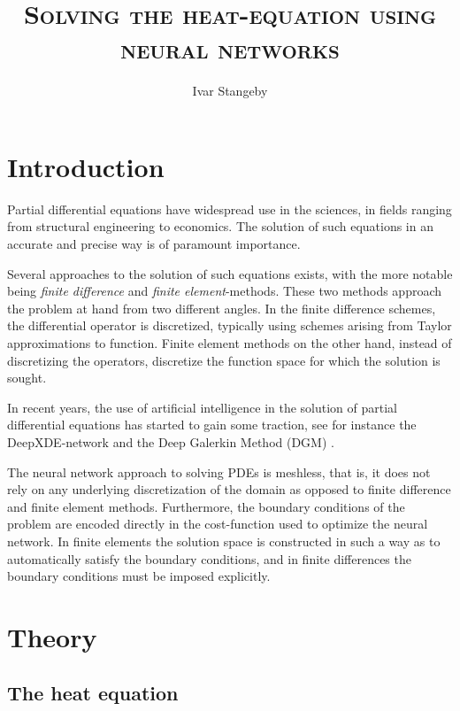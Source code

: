 \documentclass[article, a4paper, oneside]{memoir}
\title{\textsc{Solving the heat-equation using neural networks}}
\author{Ivar Stangeby}
\begin{document}
	\maketitle	

	\chapter{Introduction}

	Partial differential equations have widespread use in the sciences, in
	fields ranging from structural engineering to economics. The solution
	of such equations in an accurate and precise way is of paramount
	importance.

	Several approaches to the solution of such equations exists, with the
	more notable being \emph{finite difference} and \emph{finite
	element}-methods. These two methods approach the problem at hand from
	two different angles. In the finite difference schemes, the
	differential operator is discretized, typically using schemes arising
	from Taylor approximations to function. Finite element methods on the
	other hand, instead of discretizing the operators, discretize the
	function space for which the solution is sought.

	In recent years, the use of artificial intelligence in the solution of
	partial differential equations has started to gain some traction, see
	for instance the DeepXDE-network \cite{luDeepXDEDeepLearning2019} and
	the Deep Galerkin Method (DGM)
	\cite{al-aradiSolvingNonlinearHighDimensional}.
	
	The neural network approach to solving PDEs is meshless, that is, it
	does not rely on any underlying discretization of the domain as opposed
	to finite difference and finite element methods. Furthermore, the
	boundary conditions of the problem are encoded directly in the
	cost-function used to optimize the neural network. In finite elements
	the solution space is constructed in such a way as to automatically
	satisfy the boundary conditions, and in finite differences the boundary
	conditions must be imposed explicitly.

	\chapter{Theory}

	\section{The heat equation}	
\end{document}

